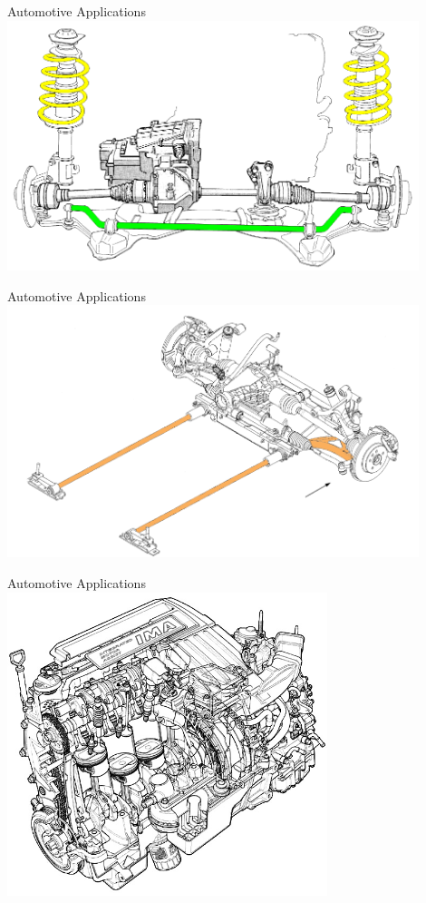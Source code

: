 \documentclass[10pt, svgnames]{beamer}
\begin{document}
\begin{frame}[label={sec:orgc355cb7}]{Automotive Applications}
\includegraphics[width=0.9\textwidth]{pictures/car-suspension}
\end{frame}

\begin{frame}[label={sec:org7e8fb85}]{Automotive Applications}
\includegraphics[width=0.9\textwidth]{pictures/front-suspension}
\end{frame}

\begin{frame}[label={sec:orgc1c6f62}]{Automotive Applications}
\centering
  \includegraphics[width=0.7\textwidth]{pictures/engine}
\end{frame}
\end{document}
